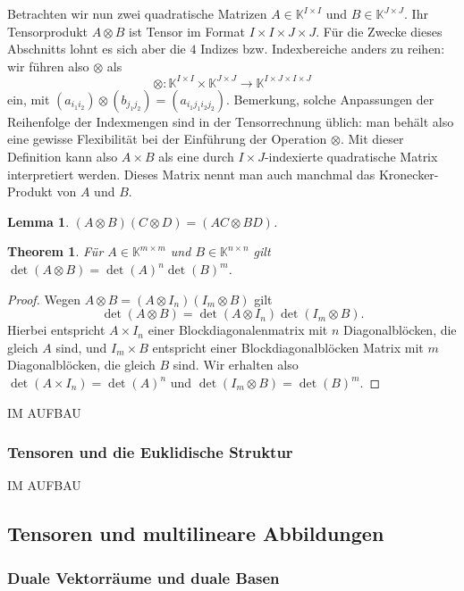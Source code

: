 \documentclass[
a4paper,12pt,
bibliography=totocnumbered,
numbers=noenddot,
]{scrartcl}
\numberwithin{equation}{subsection}
\newcommand{\K}{\mathbb K}
\theoremstyle{plain}
\newtheorem*{thm}{Theorem}
\newtheorem*{lm}{Lemma}
\theoremstyle{definition}
\begin{document}
Betrachten wir nun zwei quadratische Matrizen $A \in \K^{I \times I}$ und $B \in \K^{J \times J}$. Ihr Tensorprodukt $A \otimes B$ ist Tensor im Format $I \times I \times J \times J$. Für die Zwecke dieses Abschnitts lohnt es sich aber die $4$ Indizes bzw. Indexbereiche anders zu reihen: wir führen also $\otimes$ als 
\[
	\otimes : \K^{I \times I} \times \K^{J \times J} \to \K^{I \times J \times I \times J} 
\]
ein, mit $(a_{i_1 i_2} ) \otimes (b_{j_1 j_2}) = (a_{i_1 j_1 i_2 j_2})$. Bemerkung, solche Anpassungen der Reihenfolge der Indexmengen sind in der Tensorrechnung üblich: man behält also eine gewisse Flexibilität bei der Einführung der Operation $\otimes$. Mit dieser Definition kann also $A \times B$ als eine durch $I \times J$-indexierte quadratische Matrix interpretiert werden. Dieses Matrix nennt man auch manchmal das Kronecker-Produkt von $A$ und $B$. 

\begin{lm}
	$(A \otimes B) (C \otimes D) = (AC \otimes BD)$. 
\end{lm} 

\begin{thm}
		Für $A \in \K^{m \times m}$ und $B \in \K^{n\times n}$ gilt $\det(A \otimes B) = \det(A)^n \det(B)^m$. 
\end{thm} 
\begin{proof} 
	Wegen $A \otimes B = (A \otimes I_n) (I_m  \otimes B)$ gilt 
	\[
		\det(A \otimes B) = \det(A \otimes I_n) \det (I_m \otimes B). 
	\]
Hierbei entspricht $A \times I_n$ einer Blockdiagonalenmatrix mit $n$ Diagonalblöcken, die gleich $A$ sind, und $I_m \times B$ entspricht einer Blockdiagonalblöcken Matrix mit $m$ Diagonalblöcken, die gleich $B$ sind. Wir erhalten also $\det( A \times I_n) = \det(A)^n$ und $\det(I_m \otimes B) = \det(B)^m$. 
\end{proof} 

IM AUFBAU 

\subsubsection{Tensoren und die Euklidische Struktur} 

IM AUFBAU 

\subsection{Tensoren und multilineare Abbildungen} 

\subsubsection{Duale Vektorräume und duale Basen}
\end{document}
